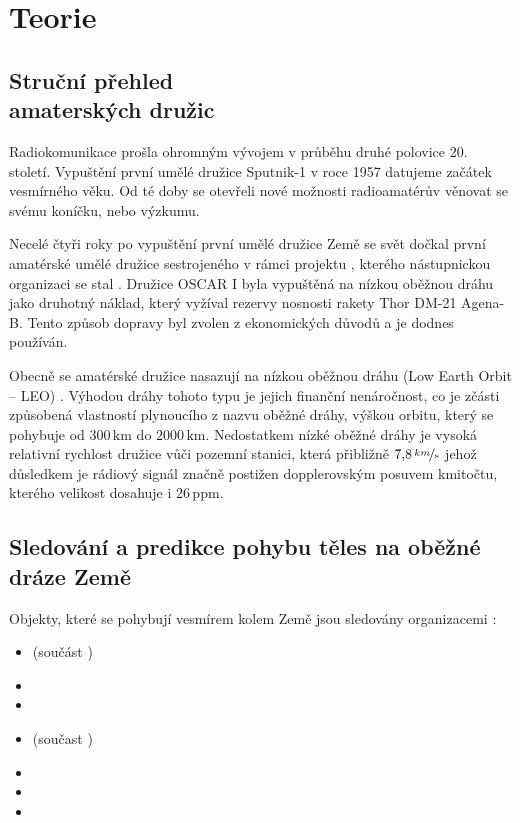 \chapter{Teorie}
\section[Struční přehled amaterských družic]{Struční přehled\\ amaterských družic}

Radiokomunikace prošla ohromným vývojem v průběhu druhé polovice 20. století. Vypuštění první umělé družice Sputnik-1 v roce 1957 datujeme začátek vesmírného věku. Od té doby se otevřeli nové možnosti radioamatérův věnovat se svému koníčku, nebo výzkumu.

    Necelé čtyři roky po vypuštění první umělé družice Země se svět dočkal první amatérské umělé družice sestrojeného v rámci projektu  \cite{wiki:amateur_sat}, kterého nástupnickou organizaci se stal  \cite{wiki:AMSAT}. Družice OSCAR I byla vypuštěná na nízkou oběžnou dráhu jako druhotný náklad, který vyžíval rezervy nosnosti rakety  Thor DM-21 Agena-B. Tento způsob dopravy byl zvolen z ekonomických důvodů a je dodnes používán.

    Obecně se amatérské družice nasazují na nízkou oběžnou dráhu (Low Earth Orbit -- LEO) \cite{book:ARRL_handbook}. Výhodou dráhy tohoto typu je jejich finanční nenáročnost, co je zčásti způsobená vlastností plynoucího z nazvu oběžné dráhy, výškou orbitu, který se pohybuje od $300\,\mathrm{km}$ do $2000\,\mathrm{km}$. Nedostatkem nízké oběžné dráhy je vysoká relativní rychlost družice vůči pozemní stanici, která přibližně $7{,}8\,\mathrm{\nicefrac{km}{s}}$ \cite{wiki:LEO} jehož důsledkem je rádiový signál značně postižen dopplerovským posuvem kmitočtu, kterého velikost dosahuje i $26\,\mathrm{ppm}$.



\section{Sledování a predikce pohybu těles na oběžné dráze Země}

Objekty, které se pohybují vesmírem kolem Země jsou sledovány organizacemi \cite{wiki:derbis}:
\begin{itemize}
    \item {}(součást )
    \item {}
    \item {}
    \item {}(součast )
    \item {}
    \item {}
    \item {}
\end{itemize}

